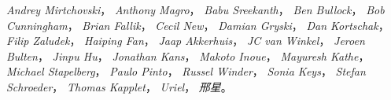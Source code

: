 \emph{Andrey Mirtchovski}，
\emph{Anthony Magro}，
\emph{Babu Sreekanth}，
\emph{Ben Bullock}，
\emph{Bob Cunningham}，
\emph{Brian Fallik}，
\emph{Cecil New}，
\emph{Damian Gryski}，
\emph{Dan Kortschak}，
\emph{Filip Zaludek}，
\emph{Haiping Fan}，
\emph{Jaap Akkerhuis}，
\emph{JC van Winkel}，
\emph{Jeroen Bulten}，
\emph{Jinpu Hu}，
\emph{Jonathan Kans}，
\emph{Makoto Inoue}，
\emph{Mayuresh Kathe}，
\emph{Michael Stapelberg}，
\emph{Paulo Pinto}，
\emph{Russel Winder}，
\emph{Sonia Keys}，
\emph{Stefan Schroeder}，
\emph{Thomas Kapplet}，
\emph{Uriel}，
\emph{邢星}。

